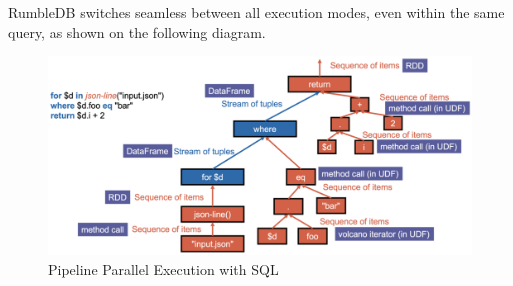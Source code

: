 RumbleDB switches seamless between all execution modes, even within the same query, as shown on the following diagram.


\begin{figure}[ht]
    \centering
    \includegraphics[width=\textwidth]{Figures/SQLExecution.png}
    \caption{Pipeline Parallel Execution with SQL}
\end{figure}




